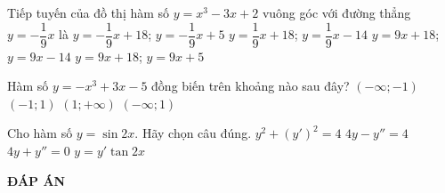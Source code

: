 \setcounter{ex}{47}

\begin{ex}%
	Tiếp tuyến của đồ thị hàm số $y=x^3-3x+2$ vuông góc với đường thẳng $y=-\dfrac{1}{9}x$ là
	\choice
	{$y=-\dfrac{1}{9}x+18$; $y=-\dfrac{1}{9}x+5$}
	{$y=\dfrac{1}{9}x+18$; $y=\dfrac{1}{9}x-14$}
	{\True $y=9x+18$; $y=9x-14$}
	{$y=9x+18$; $y=9x+5$}
\end{ex}
\begin{ex}%
Hàm số $y=-x^3+3x-5$ đồng biến trên khoảng nào sau đây?
	\choice
	{$(-\infty;-1)$}
	{\True $(-1; 1)$}
	{$(1;+\infty)$}
	{$(-\infty;1)$}
\end{ex}
\begin{ex}%
Cho hàm số $y=\sin 2x$. Hãy chọn câu đúng.
	\choice
	{$y^2+(y')^2=4$}
	{$4y-y''=4$}
	{\True $4y+y''=0$}
	{$y=y' \tan 2x$}
\end{ex}

\newpage
\begin{center}
	\textbf{ĐÁP ÁN}
\end{center}
\begin{multicols}{10}
	
\end{multicols}

